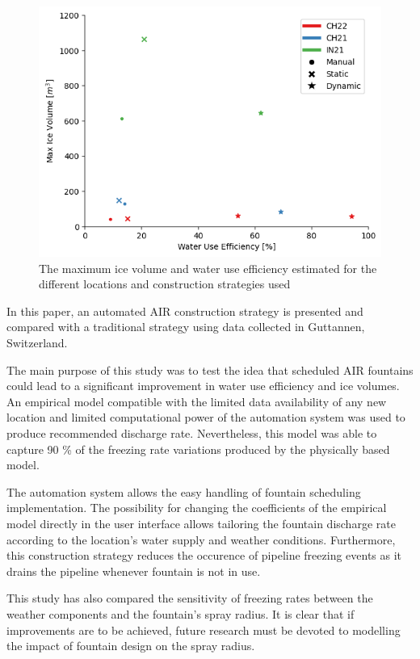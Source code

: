 \documentclass[tc, manuscript]{copernicus}
\begin{document}
\begin{figure}[t]
\includegraphics[width=12cm]{Figures/wue.png}
\caption{The maximum ice volume and water use efficiency estimated for the different locations and construction
strategies used} 
\label{fig:wue} 
\end{figure}

\conclusions
In this paper, an automated AIR construction strategy is presented and compared with a traditional strategy
using data collected in Guttannen, Switzerland.

The main purpose of this study was to test the idea that scheduled AIR fountains could lead to a significant
improvement in water use efficiency and ice volumes. An empirical model compatible with the limited data
availability of any new location and limited computational power of the automation system was used to produce
recommended discharge rate. Nevertheless, this model was able to capture 90 \% of the freezing rate variations
produced by the physically based model.

The automation system allows the easy handling of fountain scheduling implementation. The possibility for
changing the coefficients of the empirical model directly in the user interface allows tailoring the fountain
discharge rate according to the location's water supply and weather conditions. Furthermore, this construction
strategy reduces the occurence of pipeline freezing events as it drains the pipeline whenever fountain is not in
use.

This study has also compared the sensitivity of freezing rates between the weather components and the fountain's
spray radius. It is clear that if improvements are to be achieved, future research must be devoted to modelling
the impact of fountain design on the spray radius.
\end{document}
